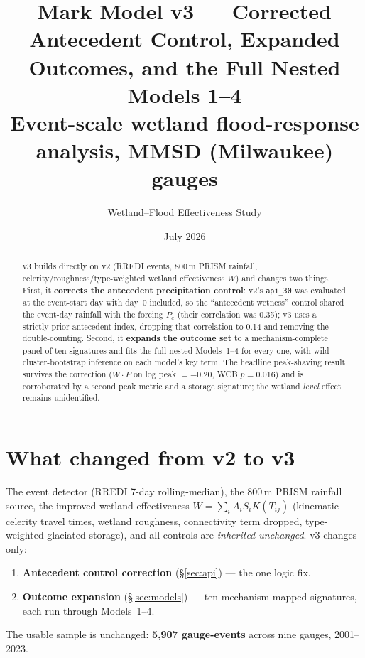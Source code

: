\documentclass[11pt]{article}
\title{\textbf{Mark Model v3 --- Corrected Antecedent Control, Expanded Outcomes,
and the Full Nested Models 1--4}\\[3pt]
\large Event-scale wetland flood-response analysis, MMSD (Milwaukee) gauges}
\author{Wetland--Flood Effectiveness Study}
\date{July 2026}
\begin{document}
\maketitle
\vspace{-1em}
\begin{abstract}\noindent\small
v3 builds directly on v2 (RREDI events, 800\,m PRISM rainfall, celerity/roughness/type-weighted
wetland effectiveness $W$) and changes two things. First, it \textbf{corrects the antecedent
precipitation control}: v2's \texttt{api\_30} was evaluated at the event-start day with day~0
included, so the ``antecedent wetness'' control shared the event-day rainfall with the forcing
$P_e$ (their correlation was 0.35); v3 uses a strictly-prior antecedent index, dropping that
correlation to 0.14 and removing the double-counting. Second, it \textbf{expands the outcome set}
to a mechanism-complete panel of ten signatures and fits the full nested Models~1--4 for every one,
with wild-cluster-bootstrap inference on each model's key term. The headline peak-shaving result
survives the correction ($W\!\cdot\!P$ on log peak $=-0.20$, WCB $p=0.016$) and is corroborated by
a second peak metric and a storage signature; the wetland \emph{level} effect remains unidentified.
\normalsize\end{abstract}

\section{What changed from v2 to v3}
The event detector (RREDI 7-day rolling-median), the 800\,m PRISM rainfall source, the improved
wetland effectiveness $W=\sum_i A_iS_iK(T_{ij})$ (kinematic-celerity travel times, wetland
roughness, connectivity term dropped, type-weighted glaciated storage), and all controls are
\emph{inherited unchanged}. v3 changes only:
\begin{enumerate}\itemsep2pt
\item \textbf{Antecedent control correction} (\S\ref{sec:api}) --- the one logic fix.
\item \textbf{Outcome expansion} (\S\ref{sec:models}) --- ten mechanism-mapped signatures, each
run through Models~1--4.
\end{enumerate}
The usable sample is unchanged: \textbf{5{,}907 gauge-events} across nine gauges, 2001--2023.
\end{document}
